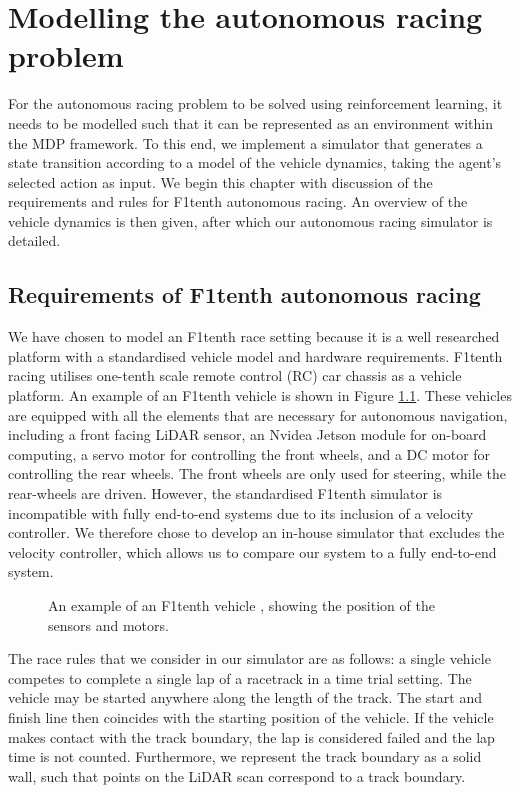 \chapter{Modelling the autonomous racing problem}
\label{chp:modelling}

For the autonomous racing problem to be solved using reinforcement learning, it needs to be modelled such that it can be represented as an environment within the MDP framework.
To this end, we implement a simulator that generates a state transition according to a model of the vehicle dynamics, taking the agent's selected action as input.
We begin this chapter with discussion of the requirements and rules for F1tenth autonomous racing.
An overview of the vehicle dynamics is then given, after which our autonomous racing simulator is detailed. 


\section{Requirements of F1tenth autonomous racing}\label{sec:f1tenth_requirements}


We have chosen to model an F1tenth race setting because it is a well researched platform with a standardised vehicle model and hardware requirements.
F1tenth racing utilises one-tenth scale remote control (RC) car chassis as a vehicle platform.
An example of an F1tenth vehicle is shown in Figure \ref{fig:sim_vehicle}.
These vehicles are equipped with all the elements that are necessary for autonomous navigation, including a front facing LiDAR sensor, an Nvidea Jetson module for on-board computing, a servo motor for controlling the front wheels, and a DC motor for controlling the rear wheels.
The front wheels are only used for steering, while the rear-wheels are driven.
However, the standardised F1tenth simulator is incompatible with fully end-to-end systems due to its inclusion of a velocity controller.
We therefore chose to develop an in-house simulator that excludes the velocity controller, which allows us to compare our system to a fully end-to-end system.


\begin{figure}[htb!]
    \centering
    
    \caption[The simulated F1tenth vehicle]{An example of an F1tenth vehicle \cite{f1tenth}, showing the position of the sensors and motors.}
    \label{fig:sim_vehicle}
\end{figure}

The race rules that we consider in our simulator are as follows: a single vehicle competes to complete a single lap of a racetrack in a time trial setting.
The vehicle may be started anywhere along the length of the track.
The start and finish line then coincides with the starting position of the vehicle.
If the vehicle makes contact with the track boundary, the lap is considered failed and the lap time is not counted.
Furthermore, we represent the track boundary as a solid wall, such that points on the LiDAR scan correspond to a track boundary.


